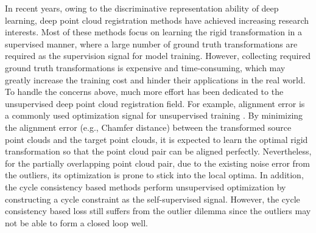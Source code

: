 \documentclass[letterpaper]{article} %
\begin{document}
	In recent years, owing to the discriminative representation ability of deep learning, deep point cloud registration methods have achieved increasing research interests.
	Most of these methods \cite{pais20203dregnet,fu2021robust, ali2021rpsrnet} focus on learning the rigid transformation in a supervised manner, where a large number of ground truth transformations are required as the supervision signal for model training. 
	However, collecting required ground truth transformations is expensive and time-consuming, which may greatly increase the training cost and hinder their applications in the real world. 
	To handle the concerns above, much more effort has been dedicated to the unsupervised deep point cloud registration field. 
	For example, alignment error is a commonly used optimization signal for unsupervised training \cite{wang2020unsupervised}. 
	By minimizing the alignment error (e.g., Chamfer distance) between the transformed source point clouds and the target point clouds, it is expected to learn the optimal rigid transformation so that the point cloud pair can be aligned perfectly. 
	Nevertheless, for the partially overlapping point cloud pair, due to the existing noise error from the outliers, its optimization is prone to stick into the local optima.
	In addition, the cycle consistency based methods \cite{yang2020mapping} perform unsupervised optimization by constructing a cycle constraint as the self-supervised signal. 
	However, the cycle consistency based loss still suffers from the outlier dilemma since the outliers may not be able to form a closed loop well. 
	
\end{document}

